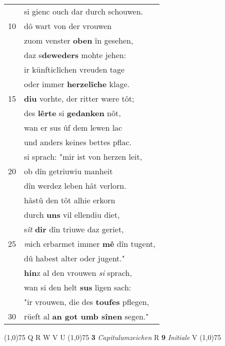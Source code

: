 \documentclass[8pt,a4paper,notitlepage]{article}
\begin{document}
\begin{table}[ht]
\begin{minipage}[t]{0.5\linewidth}
\begin{tabular}{rl}
 & si gienc ouch dar durch schouwen.\\ 
10 & dô wart von der vrouwen\\ 
 & zuom venster \textbf{oben} în gesehen,\\ 
 & daz s\textbf{deweders} mohte jehen:\\ 
 & ir künfticlîchen vreuden tage\\ 
 & oder immer \textbf{herzelîche} klage.\\ 
15 & \textbf{diu} vorhte, der ritter wære tôt;\\ 
 & des \textbf{lêrte} si \textbf{gedanken} nôt,\\ 
 & wan er sus ûf dem lewen lac\\ 
 & und anders keines bettes pflac.\\ 
 & si sprach: "mir ist von herzen leit,\\ 
20 & ob dîn getriuwiu manheit\\ 
 & dîn werdez leben hât verlorn.\\ 
 & hâstû den tôt alhie erkorn\\ 
 & durch \textbf{uns} vil ellendiu diet,\\ 
 & s\textit{ît} \textbf{dir} dîn triuwe daz geriet,\\ 
25 & \textit{m}ich erbarmet immer \textbf{mê} dîn tugent,\\ 
 & dû habest alter oder jugent."\\ 
 & \textbf{hin}z al den vrouwen \textit{si} sprach,\\ 
 & wan si den helt \textbf{sus} ligen sach:\\ 
 & "ir vrouwen, die des \textbf{toufes} pflegen,\\ 
30 & rüeft al \textbf{an got umb sînen} segen."\\ 
\end{tabular}
\scriptsize
\line(1,0){75} \newline
Q R W V U \newline
\line(1,0){75} \newline
\textbf{3} \textit{Capitulumzeichen} R  \textbf{9} \textit{Initiale} V  \newline
\line(1,0){75} \newline

\end{minipage}
\end{table}
\end{document}
